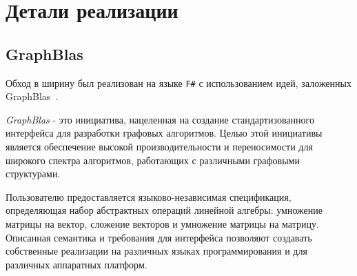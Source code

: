 
\section{Детали реализации}
\subsection{GraphBlas}
Обход в ширину был реализован на языке \texttt{F\#} с использованием идей, заложенных GraphBlas~\cite{graphBlas}.

\textit{GraphBlas} - это инициатива, нацеленная на создание стандартизованного интерфейса для разработки графовых алгоритмов. Целью этой инициативы является обеспечение высокой производительности и переносимости для широкого спектра алгоритмов, работающих с различными графовыми структурами.

Пользователю предоставляется языково-независимая спецификация, определяющая набор абстрактных операций линейной алгебры: умножение матрицы на вектор, сложение векторов и умножение матрицы на матрицу. Описанная семантика и требования для интерфейса позволяют создавать собственные реализации на различных языках программирования и для различных аппаратных платформ. 


